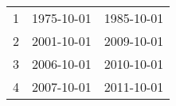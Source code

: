 % 
\begin{tabular}{ccc}
  \hline
  \hline
1 & 1975-10-01 & 1985-10-01 \\ 
  2 & 2001-10-01 & 2009-10-01 \\ 
  3 & 2006-10-01 & 2010-10-01 \\ 
  4 & 2007-10-01 & 2011-10-01 \\ 
   \hline
\end{tabular}
